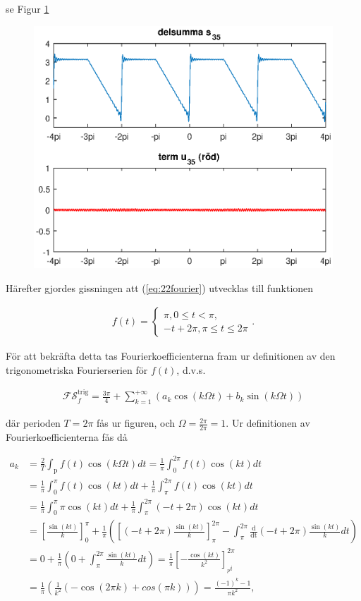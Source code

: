\documentclass[a4paper]{article}
\begin{document}
se Figur \ref{fig:serie22}

\begin{figure}[h!]
  \centering
  \includegraphics[width=0.75\linewidth]{serie22.eps}
  \caption{}
  \label{fig:serie22}
\end{figure} 

\noindent Härefter gjordes gissningen att (\ref{eq:22fourier}) utvecklas till funktionen

\begin{align*}
  f(t) =
  \begin{cases}
    \pi, 0 \leq t < \pi,\\
    -t + 2\pi, \pi \leq t \leq 2\pi
  \end{cases}.
\end{align*}

För att bekräfta detta tas Fourierkoefficienterna fram ur definitionen av
den trigonometriska Fourierserien för $f(t)$, d.v.s.

\begin{align*}
  \mathcal{FS}_f^{\text{trig}} = \frac{3\pi}{4} + \sum_{k=1}^{+\infty}\left( a_k\cos(k\Omega t) + b_k\sin(k\Omega t) \right)
\end{align*}

\noindent där perioden $T = 2\pi$ fås ur figuren, och $\Omega =
\frac{2\pi}{2\pi} = 1$. Ur definitionen av Fourierkoefficienterna fås då

\setlength{\jot}{10pt}
\begin{align*}
  a_k &= \frac{2}{T}\int_{\text{p}}f(t)\cos(k\Omega t) dt = \frac{1}{\pi}\int_0^{2\pi}f(t)\cos(kt)dt\\
      &= \frac{1}{\pi}\int_0^{\pi}f(t)\cos(kt)dt + \frac{1}{\pi}\int_{\pi}^{2\pi}f(t)\cos(kt)dt\\
      &= \frac{1}{\pi}\int_0^{\pi}\pi\cos(kt)dt + \frac{1}{\pi}\int_{\pi}^{2\pi}(-t + 2\pi)\cos(kt)dt\\
      & = \left[ \frac{\sin(kt)}{k} \right]_0^{\pi} + \frac{1}{\pi}\left( \left[ (-t + 2\pi)\frac{\sin(kt)}{k} \right]_{\pi}^{2\pi} - \int_{\pi}^{2\pi}\frac{\text{d}}{\text{dt}}(-t + 2\pi)\frac{\sin(kt)}{k}dt \right)\\
      &= 0 + \frac{1}{\pi}\left( 0 + \int_{\pi}^{2\pi}\frac{\sin(kt)}{k}dt \right) = \frac{1}{\pi}\left[ -\frac{\cos(kt)}{k^2} \right]_{_pi}^{2\pi}\\
  &= \frac{1}{\pi}\left( \frac{1}{k^2}(-\cos(2\pi k) + cos(\pi k)) \right) = \frac{(-1)^k - 1}{\pi k^2},
\end{align*}
\end{document}
